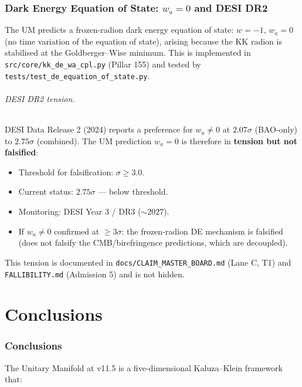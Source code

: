 \documentclass[12pt,a4paper]{article}
\begin{document}
\section{Dark Energy Equation of State: \texorpdfstring{$w_a = 0$}{wa=0} and DESI DR2}
\label{sec:de-desi}

The UM predicts a frozen-radion dark energy equation of state: $w = -1$,
$w_a = 0$ (no time variation of the equation of state), arising because the KK
radion is stabilised at the Goldberger--Wise minimum.  This is implemented in
\texttt{src/core/kk\_de\_wa\_cpl.py} (Pillar 155) and tested by
\texttt{tests/test\_de\_equation\_of\_state.py}.

\paragraph{DESI DR2 tension.}
DESI Data Release 2 (2024) reports a preference for $w_a \neq 0$ at
$2.07\sigma$ (BAO-only) to $2.75\sigma$ (combined).  The UM prediction
$w_a = 0$ is therefore in \textbf{tension but not falsified}:
\begin{itemize}
  \item Threshold for falsification: $\sigma \geq 3.0$.
  \item Current status: $2.75\sigma$ — below threshold.
  \item Monitoring: DESI Year 3 / DR3 ($\sim 2027$).
  \item If $w_a \neq 0$ confirmed at $\geq 3\sigma$: the frozen-radion DE
        mechanism is falsified (does not falsify the CMB/birefringence predictions,
        which are decoupled).
\end{itemize}
This tension is documented in \texttt{docs/CLAIM\_MASTER\_BOARD.md} (Lane C, T1)
and \texttt{FALLIBILITY.md} (Admission 5) and is not hidden.

\part{Conclusions}

\section{Conclusions}
\label{sec:conclusions}

The Unitary Manifold at v11.5 is a five-dimensional Kaluza--Klein framework
that:
\end{document}

